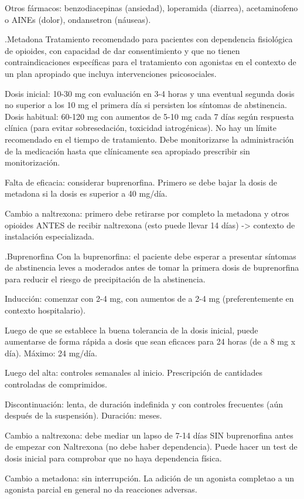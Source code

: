 Otros fármacos: benzodiacepinas (ansiedad), loperamida (diarrea), acetaminofeno o AINEs (dolor), ondansetron (náuseas).

.Metadona
Tratamiento recomendado para pacientes con dependencia fisiológica de opioides, con capacidad de dar consentimiento y que no tienen contraindicaciones específicas para el tratamiento con agonistas en el contexto de un plan apropiado que incluya intervenciones psicosociales.

Dosis inicial: 10-30 mg con evaluación en 3-4 horas y una eventual segunda dosis no superior a los 10 mg el primera día si persisten los síntomas de abstinencia.
Dosis habitual: 60-120 mg con aumentos de 5-10 mg cada 7 días según respuesta clínica (para evitar sobresedación, toxicidad iatrogénicas). No hay un límite recomendado en el tiempo de tratamiento.
Debe monitorizarse la administración de la medicación hasta que clínicamente sea apropiado prescribir sin monitorización.

Falta de eficacia: considerar buprenorfina. Primero se debe bajar la dosis de metadona si la dosis es superior a 40 mg/día.

Cambio a naltrexona: primero debe retirarse por completo la metadona y otros opioides ANTES de recibir naltrexona (esto puede llevar 14 días) -> contexto de instalación especializada.


.Buprenorfina
Con la buprenorfina: el paciente debe esperar a presentar síntomas de abstinencia leves a moderados antes de tomar la primera dosis de buprenorfina para reducir el riesgo de precipitación de la abstinencia.

Inducción: comenzar con 2-4 mg, con aumentos de a 2-4 mg (preferentemente en contexto hospitalario).

Luego de que se establece la buena tolerancia de la dosis inicial, puede aumentarse de forma rápida a dosis que sean eficaces para 24 horas (de a 8 mg x día). Máximo: 24 mg/día.

Luego del alta: controles semanales al inicio. Prescripción de cantidades controladas de comprimidos.

Discontinuación: lenta, de duración indefinida y con controles frecuentes (aún después de la suspensión). Duración: meses.

Cambio a naltrexona: debe mediar un lapso de 7-14 días SIN buprenorfina antes de empezar con Naltrexona (no debe haber dependencia). Puede hacer un test de dosis inicial para comprobar que no haya dependencia física.

Cambio a metadona: sin interrupción. La adición de un agonista completao a un agonista parcial en general no da reacciones adversas.

